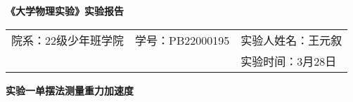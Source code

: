 \documentclass[UTF8]{article}
\begin{document}
\thispagestyle{empty}

    \begin{center}
    \bf\LARGE{《大学物理实验》实验报告}
    \end{center}
     
    \begin{center}
        \centering
        \begin{tabularx}{\textwidth}{XZY}
            {院系：22级少年班学院}&{学号：PB22000195}&{实验人姓名：王元叙}\\
            {}&{}&{实验时间：3月28日}\\
        \hline      
        \end{tabularx}
    \end{center}
    


\begin{center}
    \Large{\bf \Large 实验一\quad 单摆法测量重力加速度}
\end{center}
\end{document}
